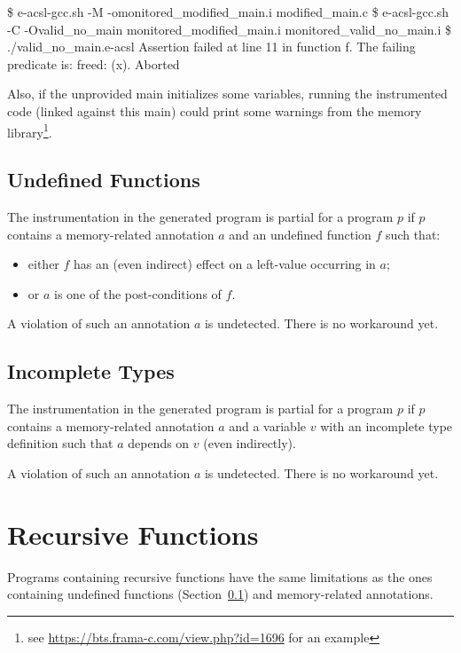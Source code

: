 \begin{logs}
\$ e-acsl-gcc.sh -M -omonitored_modified_main.i modified_main.c
\$ e-acsl-gcc.sh -C -Ovalid_no_main monitored_modified_main.i monitored_valid_no_main.i
\$ ./valid_no_main.e-acsl
Assertion failed at line 11 in function f.
The failing predicate is:
freed: \valid(x).
Aborted
\end{logs}

Also, if the unprovided main initializes some variables, running the
instrumented code (linked against this main) could print some warnings from the
\eacsl memory library\footnote{see
  \url{https://bts.frama-c.com/view.php?id=1696} for an example}.

\subsection{Undefined Functions}
\label{sec:limits:no-code}

The instrumentation in the generated program is partial for a program $p$ if $p$
contains a memory-related annotation $a$ and an undefined function
$f$ such that:
\begin{itemize}
\item either $f$ has an (even indirect) effect on a left-value occurring in $a$;
\item or $a$ is one of the post-conditions of $f$.
\end{itemize}
A violation of such an annotation $a$ is undetected. There is no workaround yet.

\subsection{Incomplete Types}

The instrumentation in the generated program is partial for a program $p$ if $p$
contains a memory-related annotation $a$ and a variable $v$ with an incomplete
type definition such that $a$ depends on $v$ (even indirectly).

A violation of such an annotation $a$ is undetected. There is no workaround yet.

\section{Recursive Functions}

Programs containing recursive functions have the same limitations as the ones
containing undefined functions (Section~\ref{sec:limits:no-code}) and
memory-related annotations.

